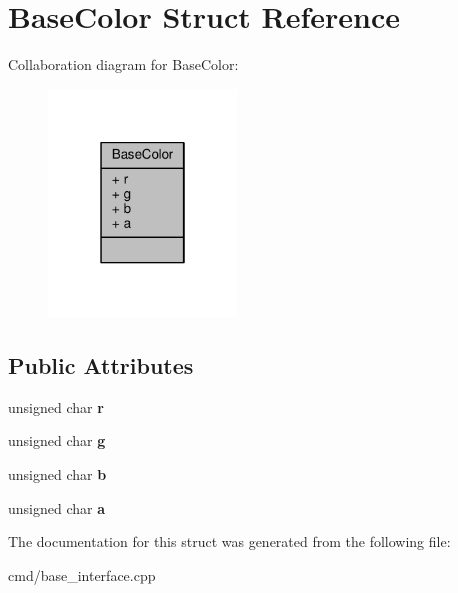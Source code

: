 \hypertarget{structBaseColor}{}\section{Base\+Color Struct Reference}
\label{structBaseColor}


Collaboration diagram for Base\+Color\+:
\nopagebreak
\begin{figure}[H]
\begin{center}
\leavevmode
\includegraphics[width=142pt]{d7/d9d/structBaseColor__coll__graph}
\end{center}
\end{figure}
\subsection*{Public Attributes}
\begin{DoxyCompactItemize}
\item 
unsigned char {\bfseries r}\hypertarget{structBaseColor_a0aa0445305b1bf070ac668fdafba78da}{}\label{structBaseColor_a0aa0445305b1bf070ac668fdafba78da}

\item 
unsigned char {\bfseries g}\hypertarget{structBaseColor_ac8306b8840021e027055b38ef9318ea1}{}\label{structBaseColor_ac8306b8840021e027055b38ef9318ea1}

\item 
unsigned char {\bfseries b}\hypertarget{structBaseColor_a0bd01f7bb943a2b9c490bac957b85256}{}\label{structBaseColor_a0bd01f7bb943a2b9c490bac957b85256}

\item 
unsigned char {\bfseries a}\hypertarget{structBaseColor_aa6487991d594f0d9eb2758c980888580}{}\label{structBaseColor_aa6487991d594f0d9eb2758c980888580}

\end{DoxyCompactItemize}


The documentation for this struct was generated from the following file\+:\begin{DoxyCompactItemize}
\item 
cmd/base\+\_\+interface.\+cpp\end{DoxyCompactItemize}

